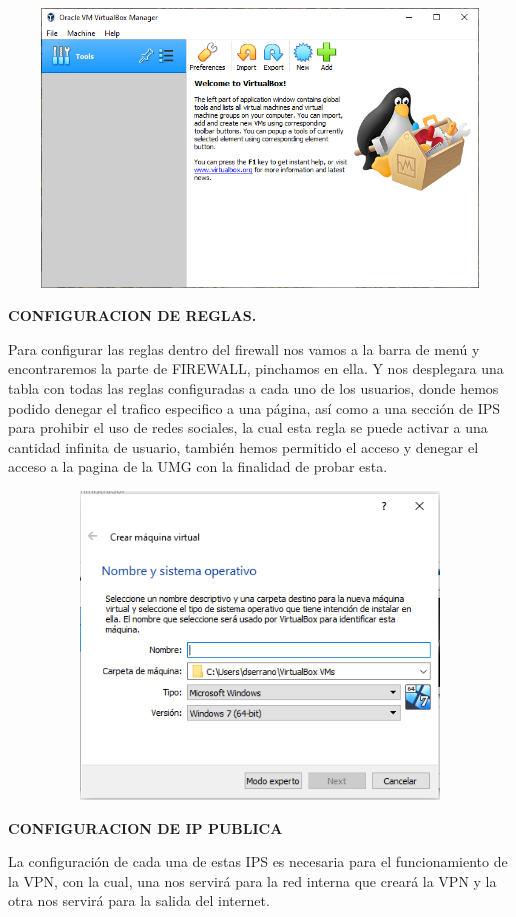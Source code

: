 \documentclass[
]{article}
\begin{document}
\includegraphics[width=6.1375in,height=2.91319in]{media/image3.png}

\textbf{CONFIGURACION DE REGLAS.}

Para configurar las reglas dentro del firewall nos vamos a la barra de
menú y encontraremos la parte de FIREWALL, pinchamos en ella. Y nos
desplegara una tabla con todas las reglas configuradas a cada uno de los
usuarios, donde hemos podido denegar el trafico especifico a una página,
así como a una sección de IPS para prohibir el uso de redes sociales, la
cual esta regla se puede activar a una cantidad infinita de usuario,
también hemos permitido el acceso y denegar el acceso a la pagina de la
UMG con la finalidad de probar esta.

\includegraphics[width=6.38542in,height=3.21872in]{media/image4.png}

\textbf{CONFIGURACION DE IP PUBLICA}

La configuración de cada una de estas IPS es necesaria para el
funcionamiento de la VPN, con la cual, una nos servirá para la red
interna que creará la VPN y la otra nos servirá para la salida del
internet.
\end{document}
